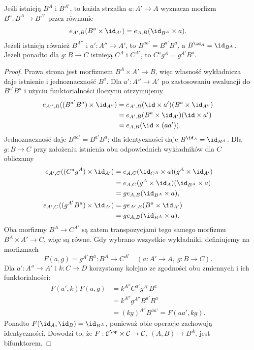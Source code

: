 \begin{stwierdzenie}\label{cat:prop:exp-argument}
Jeśli istnieją $B^A$ i $B^{A'}$, to każda strzałka $a:A'\to A$ wyznacza morfizm $B^a:B^A\to B^{A'}$ przez równanie
\[
e_{A',B}(B^a\times\id_{A'})
=e_{A,B}(\id_{B^A}\times a).
\]
Jeżeli istnieją również $B^{A''}$ i $a':A''\to A'$, to $B^{aa'}=B^{a'}B^a$, a $B^{\id_A}=\id_{B^A}$. Jeżeli ponadto dla $g:B\to C$ istnieją $C^A$ i $C^{A'}$, to $C^ag^A=g^{A'}B^a$.
\end{stwierdzenie}
\begin{proof}
Prawa strona jest morfizmem $B^A\times A'\to B$, więc własność wykładnicza daje istnienie i jednoznaczność $B^a$. Dla $a':A''\to A'$ po zastosowaniu ewaluacji do $B^{a'}B^a$ i użyciu funktorialności iloczynu otrzymujemy
\[
\begin{aligned}
e_{A'',B}((B^{a'}B^a)\times\id_{A''})
&=e_{A',B}(\id\times a')(B^a\times\id_{A''})\\
&=e_{A',B}(B^a\times\id_{A'})(\id\times a')\\
&=e_{A,B}(\id\times(aa')).
\end{aligned}
\]
Jednoznaczność daje $B^{aa'}=B^{a'}B^a$; dla identyczności daje $B^{\id_A}=\id_{B^A}$. Dla $g:B\to C$ przy założeniu istnienia obu odpowiednich wykładników dla $C$ obliczamy
\[
\begin{aligned}
e_{A',C}((C^ag^A)\times\id_{A'})
&=e_{A,C}(\id_{C^A}\times a)(g^A\times\id_{A'})\\
&=e_{A,C}(g^A\times\id_A)(\id_{B^A}\times a)\\
&=ge_{A,B}(\id_{B^A}\times a),\\
e_{A',C}((g^{A'}B^a)\times\id_{A'})
&=g e_{A',B}(B^a\times\id_{A'})\\
&=ge_{A,B}(\id_{B^A}\times a).
\end{aligned}
\]
Oba morfizmy $B^A\to C^{A'}$ są zatem transpozycjami tego samego morfizmu $B^A\times A'\to C$, więc są równe. Gdy wybrano wszystkie wykładniki, definiujemy na morfizmach
\[
F(a,g)=g^{A'}B^a:B^A\to C^{A'}
\quad(a:A'\to A,\ g:B\to C).
\]
Dla $a':A''\to A'$ i $k:C\to D$ korzystamy kolejno ze zgodności obu zmiennych i ich funktorialności:
\[
\begin{aligned}
F(a',k)F(a,g)
&=k^{A''}C^{a'}g^{A'}B^a\\
&=k^{A''}g^{A''}B^{a'}B^a\\
&=(kg)^{A''}B^{aa'}=F(aa',kg).
\end{aligned}
\]
Ponadto $F(\id_A,\id_B)=\id_{B^A}$, ponieważ obie operacje zachowują identyczności. Dowodzi to, że $F:\mathcal C^{\op}\times\mathcal C\to\mathcal C$, $(A,B)\mapsto B^A$, jest bifunktorem.
\end{proof}

